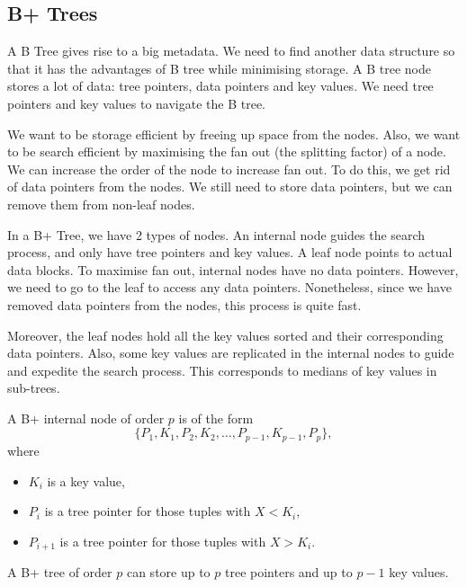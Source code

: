 \documentclass[a4paper, openany]{memoir}
\begin{document}

\subsection{B+ Trees}
A B Tree gives rise to a big metadata. We need to find another data structure so that it has the advantages of B tree while minimising storage. A B tree node stores a lot of data: tree pointers, data pointers and key values. We need tree pointers and key values to navigate the B tree. 

We want to be storage efficient by freeing up space from the nodes. Also, we want to be search efficient by maximising the fan out (the splitting factor) of a node. We can increase the order of the node to increase fan out. To do this, we get rid of data pointers from the nodes. We still need to store data pointers, but we can remove them from non-leaf nodes.

In a B+ Tree, we have 2 types of nodes. An internal node guides the search process, and only have tree pointers and key values. A leaf node points to actual data blocks. To maximise fan out, internal nodes have no data pointers. However, we need to go to the leaf to access any data pointers. Nonetheless, since we have removed data pointers from the nodes, this process is quite fast. 

Moreover, the leaf nodes hold all the key values sorted and their corresponding data pointers. Also, some key values are replicated in the internal nodes to guide and expedite the search process. This corresponds to medians of key values in sub-trees.

A B+ internal node of order $p$ is of the form
\[\{P_1, K_1, P_2, K_2, \dots, P_{p-1}, K_{p-1}, P_p\},\]
where
\begin{itemize}
    \item $K_i$ is a key value,
    \item $P_i$ is a tree pointer for those tuples with $X < K_i$,
    \item $P_{i+1}$ is a tree pointer for those tuples with $X > K_i$.
\end{itemize}
A B+ tree of order $p$ can store up to $p$ tree pointers and up to $p-1$ key values.
\end{document}

